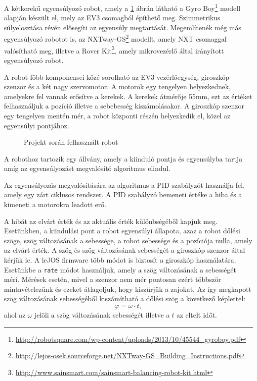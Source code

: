 A kétkerekű egyensúlyozó robot, amely a \ref{fig:gyro_boy} ábrán látható a Gyro Boy\footnote{\href{http://robotsquare.com/wp-content/uploads/2013/10/45544\_gyroboy.pdf}{http://robotsquare.com/wp-content/uploads/2013/10/45544\_gyroboy.pdf}} modell alapján készült el, mely az EV3 csomagból építhető meg. Szimmetrikus súlyelosztása révén elősegíti az egyensúly megtartását. Megemlítenék még más egyensúlyozó robotot is, az NXTway-GS\footnote{\href{http://lejos-osek.sourceforge.net/NXTway-GS\_Building\_Instructions.pdf}{http://lejos-osek.sourceforge.net/NXTway-GS\_Building\_Instructions.pdf}} modellt, amely NXT csomaggal valósítható meg, illetve a Rover Kit\footnote{\href{http://www.sainsmart.com/sainsmart-balancing-robot-kit.html}{http://www.sainsmart.com/sainsmart-balancing-robot-kit.html}}, amely mikrovezérlő által irányított egyensúlyozó robot.

A robot főbb komponensei közé sorolható az EV3 vezérlőegység, giroszkóp szenzor és a két nagy szervomotor. A motorok egy tengelyen helyezkednek, amelyekre fel vannak erősítve a kerekek. A kerekek átmérője 55mm, ezt az értéket felhasználjuk a pozíció illetve a sebebesség kiszámolásakor. A giroszkóp szenzor egy tengelyen mentén mér, a robot központi részén helyezkedik el, közel az egyensúlyi pontjához.

\begin{figure}[!htb]
	\centering
	\caption{Projekt során felhasznált robot}
	\label{fig:gyro_boy}
\end{figure}

A robothoz tartozik egy állvány, amely a kiinduló pontja és egyensúlyba tartja amíg az egyensúlyozást megvalósító algoritmus elindul. 

Az egyensúlyozás megvalósítására az algoritmus a PID szabályzót használja fel, amely egy zárt ciklusos rendszer. A PID szabályzó bemeneti értéke a hiba és a kimeneti a motorokra leadott erő.

A hibát az elvárt érték és az aktuális érték különbségéből kapjuk meg. Esetünkben, a kiindulási pont a robot egyensúlyi állapota, azaz a robot dőlési szöge, szög változásának a sebessége, a robot sebessége és a pozíciója nulla, amely az elvárt érték. A szög és szög változásának sebességét a giroszkóp szenzor által kérjük le. A leJOS firmware több módot is biztosít a giroszkóp használatára. Esetünkbe a \texttt{rate} módot használjuk, amely a szög változásának a sebességét méri. Mérések esetén, mivel a szenzor nem mér pontosan ezért többször mintavételezünk és ezeket átlagoljuk, hogy kiszűrjük a zajokat. Az így megkapott szög változásának sebességéből kiszámítható a dőlési szög a következő képlettel: $$\varphi=\omega \cdot t,$$ ahol az $\omega$ jelöli a szög változásának sebességét illetve a $t$ az eltelt időt.

